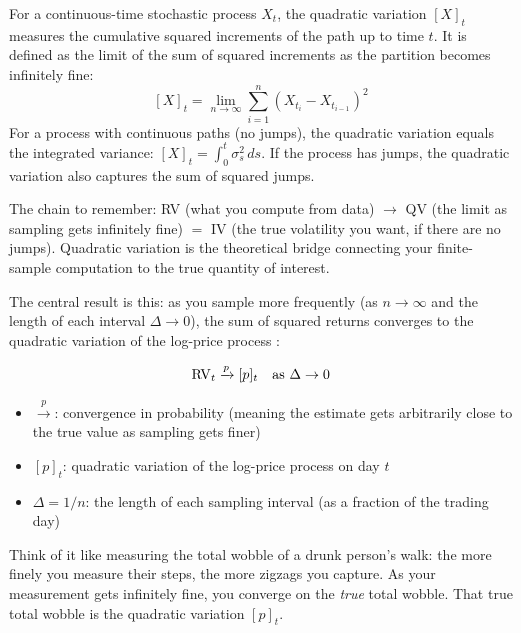 \begin{prereq}
For a continuous-time stochastic process $X_t$, the quadratic variation $[X]_t$ measures the cumulative squared increments of the path up to time $t$.
It is defined as the limit of the sum of squared increments as the partition becomes infinitely fine:
\[
  [X]_t = \lim_{n \to \infty} \sum_{i=1}^{n} (X_{t_i} - X_{t_{i-1}})^2
\]
For a process with continuous paths (no jumps), the quadratic variation equals the integrated variance: $[X]_t = \int_0^t \sigma^2_s\,ds$.
If the process has jumps, the quadratic variation also captures the sum of squared jumps.

The chain to remember: RV (what you compute from data) $\to$ QV (the limit as sampling gets infinitely fine) $=$ IV (the true volatility you want, if there are no jumps).
Quadratic variation is the theoretical bridge connecting your finite-sample computation to the true quantity of interest.
\end{prereq}

The central result is this: as you sample more frequently (as $n \to \infty$ and the length of each interval $\Delta \to 0$), the sum of squared returns converges to the quadratic variation of the log-price process \citep{ABDL2001, BNS2002}:

\begin{equation}
  \operatorname{RV}_t \xrightarrow{p} [p]_t \quad \text{as } \Delta \to 0
  \label{eq:rv-convergence}
\end{equation}
\begin{itemize}[nosep]
  \item $\xrightarrow{p}$: convergence in probability (meaning the estimate gets arbitrarily close to the true value as sampling gets finer)
  \item $[p]_t$: quadratic variation of the log-price process on day $t$
  \item $\Delta = 1/n$: the length of each sampling interval (as a fraction of the trading day)
\end{itemize}

\begin{intuition}
Think of it like measuring the total wobble of a drunk person's walk: the more finely you measure their steps, the more zigzags you capture.
As your measurement gets infinitely fine, you converge on the \emph{true} total wobble.
That true total wobble is the quadratic variation $[p]_t$.
\end{intuition}

